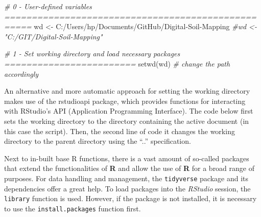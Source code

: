 \documentclass[
  10pt,
  b5paper,
  oneside]{book}
\newenvironment{Shaded}{\begin{snugshade}}{\end{snugshade}}
\newcommand{\CommentTok}[1]{\textcolor[rgb]{0.56,0.35,0.01}{\textit{#1}}}
\newcommand{\FunctionTok}[1]{\textcolor[rgb]{0.00,0.00,0.00}{#1}}
\newcommand{\NormalTok}[1]{#1}
\newcommand{\OtherTok}[1]{\textcolor[rgb]{0.56,0.35,0.01}{#1}}
\newcommand{\SpecialCharTok}[1]{\textcolor[rgb]{0.00,0.00,0.00}{#1}}
\newcommand{\StringTok}[1]{\textcolor[rgb]{0.31,0.60,0.02}{#1}}
\begin{document}
\begin{Shaded}
\begin{Highlighting}[]
\CommentTok{\# 0 {-} User{-}defined variables ===================================================}
\NormalTok{wd }\OtherTok{\textless{}{-}} \StringTok{\textquotesingle{}C:/Users/hp/Documents/GitHub/Digital{-}Soil{-}Mapping\textquotesingle{}}
\CommentTok{\#wd \textless{}{-} "C:/GIT/Digital{-}Soil{-}Mapping"}

\CommentTok{\# 1 {-} Set working directory and load necessary packages ========================}
\FunctionTok{setwd}\NormalTok{(wd) }\CommentTok{\# change the path accordingly}
\end{Highlighting}
\end{Shaded}

An alternative and more automatic approach for setting the working directory makes use of the rstudioapi package, which provides functions for interacting with RStudio's API (Application Programming Interface). The code below first sets the working directory to the directory containing the active document (in this case the script). Then, the second line of code it changes the working directory to the parent directory using the ``..'' specification.

\begin{Shaded}
\end{Shaded}

Next to in-built base R functions, there is a vast amount of so-called packages that extend the functionalities of \textbf{R} and allow the use of \textbf{R} for a broad range of purposes. For data handling and management, the \texttt{tidyverse} package and its dependencies offer a great help. To load packages into the \emph{RStudio} session, the \texttt{library} function is used. However, if the package is not installed, it is necessary to use the \texttt{install.packages} function first.
\end{document}
